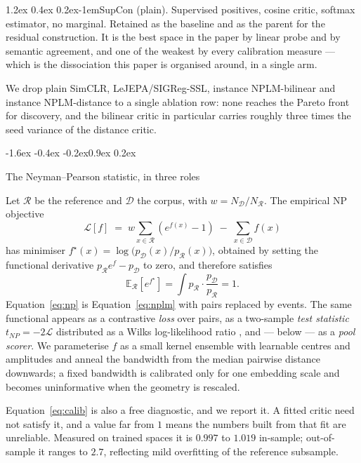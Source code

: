 \documentclass{article}
\makeatletter
\renewcommand\subsection{\@startsection{subsection}{2}{\z@}%
  {-1.6ex \@plus -0.4ex \@minus -0.2ex}{0.9ex \@plus 0.2ex}%
  {\normalsize\bf\raggedright}}
\renewcommand\paragraph{\@startsection{paragraph}{4}{\z@}%
  {1.2ex \@plus 0.4ex \@minus 0.2ex}{-1em}{\normalsize\bf}}
\newcommand{\E}{\mathbb{E}}
\newcommand{\R}{\mathcal{R}}
\newcommand{\D}{\mathcal{D}}
\makeatother
\begin{document}
\paragraph{SupCon (plain).}
Supervised positives, cosine critic, softmax estimator, no marginal. Retained
as the baseline and as the parent for the residual construction. It is the
best space in the paper by linear probe and by semantic agreement, and one of
the weakest by every calibration measure --- which is the dissociation this
paper is organised around, in a single arm.

We drop plain SimCLR, LeJEPA/SIGReg-SSL, instance NPLM-bilinear and instance
NPLM-distance to a single ablation row: none reaches the Pareto front for
discovery, and the bilinear critic in particular carries roughly three times
the seed variance of the distance critic.

\subsection{The Neyman--Pearson statistic, in three roles}
\label{sec:np}

Let $\R$ be the reference and $\D$ the corpus, with $w = N_\D / N_\R$. The
empirical NP objective
\begin{equation}
\label{eq:np}
\mathcal{L}[f] \;=\; w \sum_{x \in \R}\!\left(e^{f(x)} - 1\right) \;-\; \sum_{x \in \D} f(x)
\end{equation}
has minimiser $f^\star(x) = \log\!\big(p_\D(x)/p_\R(x)\big)$, obtained by
setting the functional derivative $p_\R e^{f} - p_\D$ to zero, and therefore
satisfies
\begin{equation}
\label{eq:calib}
\E_{\R}\!\left[e^{f^\star}\right] = \int p_\R \cdot \frac{p_\D}{p_\R} = 1 .
\end{equation}
Equation~\ref{eq:np} is Equation~\ref{eq:nplm} with pairs replaced by events.
The same functional appears as a contrastive \emph{loss} over pairs, as a
two-sample \emph{test statistic} $t_{NP} = -2\mathcal{L}$ distributed as a
Wilks log-likelihood ratio \citep{wilks1938,dagnolo2019nplm}, and --- below
--- as a \emph{pool scorer}. We parameterise $f$ as a small kernel ensemble
with learnable centres and amplitudes \citep[SparKer;][]{grosso2025sparker}
and anneal the bandwidth from the median pairwise distance
downwards; a fixed bandwidth is calibrated only for one embedding scale and
becomes uninformative when the geometry is rescaled.

Equation~\ref{eq:calib} is also a free diagnostic, and we report it. A fitted
critic need not satisfy it, and a value far from $1$ means the numbers built
from that fit are unreliable. Measured on trained spaces it is $0.997$ to
$1.019$ in-sample; out-of-sample it ranges to $2.7$, reflecting mild
overfitting of the reference subsample.
\end{document}
